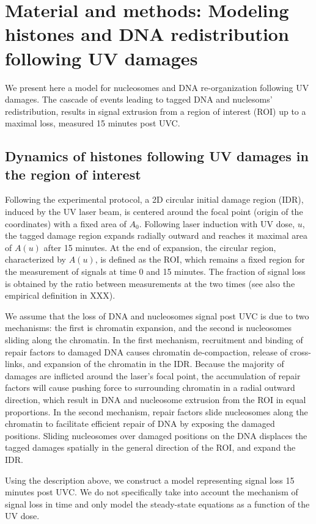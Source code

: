 \documentclass[12pt]{article}
\begin{document}
\section{Material and methods: Modeling  histones and DNA redistribution following UV damages}
We present here a model for nucleosomes and DNA re-organization following UV damages. The cascade of events leading to tagged DNA and nuclesoms'  redistribution, results in signal extrusion from a region of interest (ROI) up to a maximal loss, measured 15 minutes post UVC. 

\subsection{Dynamics of histones following UV damages in the region of interest}

Following the experimental protocol, a 2D circular initial damage region (IDR), induced by the UV laser beam, is centered around the focal point (origin of the coordinates) with a fixed area of $A_0$. Following laser induction with UV dose, $u$, the tagged damage region expands radially outward and reaches it maximal area of $A(u)$ after 15 minutes. At the end of expansion, the circular region, characterized by $A(u)$, is defined as the ROI, which remains a fixed region for the measurement of signals at time 0 and 15 minutes. The fraction of signal loss is obtained by the ratio between measurements at the two times (see also the empirical definition in XXX). 

We assume that the loss of DNA and nucleosomes signal post UVC is due to two mechanisms: the first is chromatin expansion, and the second is nucleosomes sliding along the chromatin. In the first mechanism, recruitment and binding of repair factors to damaged DNA causes chromatin de-compaction, release of cross-links, and expansion of the chromatin in the IDR. Because the majority of damages are inflicted around the laser's focal point, the accumulation of repair factors will cause pushing force to surrounding chromatin in a radial outward direction, which result in DNA and nucleosome extrusion from the ROI in equal proportions. In the second mechanism, repair factors slide nucleosomes along the chromatin to facilitate efficient repair of DNA by exposing the damaged positions. 
Sliding nucleosomes over damaged positions on the DNA displaces the tagged damages spatially in the general direction of the ROI, and expand the IDR. 
 
Using the description above, we construct a model representing signal loss 15 minutes post UVC. We do not specifically take into account the mechanism of signal loss in time and only model the steady-state equations as a function of the UV dose.
\end{document}
